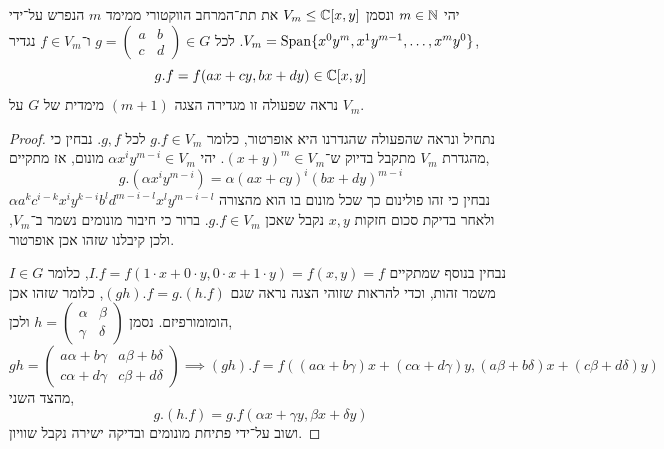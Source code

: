 \subquestion{}
יהי $m \in \mathbb{N}$ ונסמן $V_m \le \mathbb{C}[x, y]$ את תת־המרחב הווקטורי ממימד $m$ הנפרש על־ידי $V_m = \operatorname{Span}\{ x^0 y^m, x^1 y^{m - 1}, \ldots, x^m y^0 \}$.
לכל $g = (\begin{smallmatrix} a & b \\ c & d \end{smallmatrix}) \in G$ ו־$f \in V_m$ נגדיר,
\[
	g . f
	= f(a x + c y, b x + d y)
	\in \mathbb{C}[x, y]
\]
נראה שפעולה זו מגדירה הצגה $(m + 1)$ מימדית של $G$ על $V_m$.
\begin{proof}
	נתחיל ונראה שהפעולה שהגדרנו היא אופרטור, כלומר $g . f \in V_m$ לכל $g, f$.
	נבחין כי מהגדרת $V_m$ מתקבל בדיוק ש־${(x + y)}^m \in V_m$.
	יהי $\alpha x^i y^{m - i} \in V_m$ מונום, אז מתקיים,
	\[
		g . (\alpha x^i y^{m - i})
		= \alpha {(a x + c y)}^i {(b x + d y)}^{m - i}
	\]
	נבחין כי זהו פולינום כך שכל מונום בו הוא מהצורה $\alpha a^k c^{i - k} x^i y^{k - i} b^l d^{m - i - l} x^{l} y^{m - i - l}$ ולאחר בדיקת סכום חזקות $x, y$ נקבל שאכן $g . f \in V_m$.
	ברור כי חיבור מונומים נשמר ב־$V_m$, ולכן קיבלנו שזהו אכן אופרטור.

	נבחין בנוסף שמתקיים $I . f = f(1 \cdot x + 0 \cdot y, 0 \cdot x + 1 \cdot y) = f(x, y) = f$, כלומר $I \in G$ משמר זהות,
	וכדי להראות שזוהי הצגה נראה שגם $(g h) . f = g . (h . f)$, כלומר שזהו אכן הומומורפיזם.
	נסמן $h = (\begin{smallmatrix} \alpha & \beta \\ \gamma & \delta \end{smallmatrix})$ ולכן,
	\[
		g h
		= \begin{pmatrix}
			a \alpha + b \gamma & a \beta + b \delta \\
			c \alpha + d \gamma & c \beta + d \delta
		\end{pmatrix}
		\implies
		(g h) . f
		= f( (a \alpha + b \gamma) x + (c \alpha + d \gamma) y, (a \beta + b \delta) x + (c \beta + d \delta) y)
	\]
	מהצד השני,
	\[
		g . (h . f)
		= g . f(\alpha x + \gamma y, \beta x + \delta y)
	\]
	ושוב על־ידי פתיחת מונומים ובדיקה ישירה נקבל שוויון.
\end{proof}

